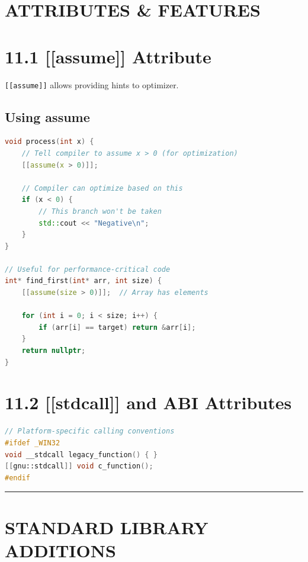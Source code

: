 \hypertarget{attributes-features}{%
\section{ATTRIBUTES \& FEATURES}\label{attributes-features}}

\hypertarget{assume-attribute}{%
\section{11.1 {[}{[}assume{]}{]} Attribute}\label{assume-attribute}}

\passthrough{\lstinline![[assume]]!} allows providing hints to
optimizer.

\hypertarget{using-assume}{%
\subsection{Using assume}\label{using-assume}}

\begin{lstlisting}[language={C++}]
void process(int x) {
    // Tell compiler to assume x > 0 (for optimization)
    [[assume(x > 0)]];
    
    // Compiler can optimize based on this
    if (x < 0) {
        // This branch won't be taken
        std::cout << "Negative\n";
    }
}

// Useful for performance-critical code
int* find_first(int* arr, int size) {
    [[assume(size > 0)]];  // Array has elements
    
    for (int i = 0; i < size; i++) {
        if (arr[i] == target) return &arr[i];
    }
    return nullptr;
}
\end{lstlisting}

\hypertarget{stdcall-and-abi-attributes}{%
\section{11.2 {[}{[}stdcall{]}{]} and ABI
Attributes}\label{stdcall-and-abi-attributes}}

\begin{lstlisting}[language={C++}]
// Platform-specific calling conventions
#ifdef _WIN32
void __stdcall legacy_function() { }
[[gnu::stdcall]] void c_function();
#endif
\end{lstlisting}

\begin{center}\rule{0.5\linewidth}{0.5pt}\end{center}

\hypertarget{standard-library-additions}{%
\section{STANDARD LIBRARY ADDITIONS}\label{standard-library-additions}}

